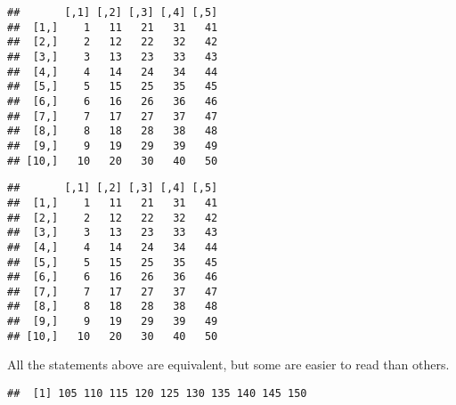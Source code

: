 \documentclass[paper=a4,headsepline,BCOR=12mm,twoside,open=right,%
titlepage,headings=small,fontsize=10pt,index=totoc,bibliography=totoc,%
captions=tableheading,captions=nooneline]{scrbook}\usepackage{knitr}
\begin{document}
\begin{knitrout}
\begin{kframe}
\begin{verbatim}
##       [,1] [,2] [,3] [,4] [,5]
##  [1,]    1   11   21   31   41
##  [2,]    2   12   22   32   42
##  [3,]    3   13   23   33   43
##  [4,]    4   14   24   34   44
##  [5,]    5   15   25   35   45
##  [6,]    6   16   26   36   46
##  [7,]    7   17   27   37   47
##  [8,]    8   18   28   38   48
##  [9,]    9   19   29   39   49
## [10,]   10   20   30   40   50
\end{verbatim}
\begin{alltt}
 \hlkwb{<-} \hlstd{(}\hlopt{:}\hlstd{,}  \hlstd{=} \hlstd{,}  \hlstd{=} \hlstd{)}
\end{alltt}
\begin{verbatim}
##       [,1] [,2] [,3] [,4] [,5]
##  [1,]    1   11   21   31   41
##  [2,]    2   12   22   32   42
##  [3,]    3   13   23   33   43
##  [4,]    4   14   24   34   44
##  [5,]    5   15   25   35   45
##  [6,]    6   16   26   36   46
##  [7,]    7   17   27   37   47
##  [8,]    8   18   28   38   48
##  [9,]    9   19   29   39   49
## [10,]   10   20   30   40   50
\end{verbatim}
\end{kframe}
\end{knitrout}

All the statements above are equivalent, but some are easier to read than others.

\begin{knitrout}\footnotesize
{}\color{fgcolor}\begin{kframe}
\begin{alltt}
 \hlkwb{<-} \hlstd{()} 
   \hlopt{:}
   \hlkwb{<-} 
     \hlopt{:}
     \hlkwb{<-}  \hlopt{+} 
\hlstd{\}}
\end{alltt}
\begin{verbatim}
##  [1] 105 110 115 120 125 130 135 140 145 150
\end{verbatim}
\end{kframe}
\end{knitrout}
\end{document}
